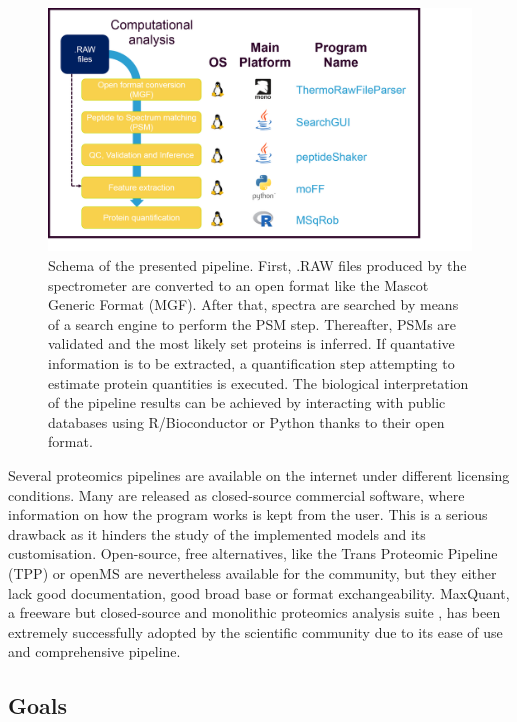 \documentclass[11pt, a4paper]{report}
\begin{document}
\begin{figure}[!h]
\includegraphics[width=\textwidth]{pipeline}
\caption{Schema of the presented pipeline. First, .RAW files produced by the spectrometer are converted to an open format like the Mascot Generic Format (\ac{MGF}). After that, spectra are searched by means of a search engine to perform the PSM step. Thereafter, PSMs are validated and the most likely set proteins is inferred. If quantative information is to be extracted, a quantification step attempting to estimate protein quantities is executed. The biological interpretation of the pipeline results can be achieved by interacting with public databases using R/Bioconductor or Python thanks to their open format.}
\label{fig:pipeline}
\end{figure}


Several proteomics pipelines are available on the internet under different licensing conditions. Many are released as closed-source commercial software, where information on how the program works is kept from the user. This is a serious drawback as it hinders the study of the implemented models and its customisation. Open-source, free alternatives, like the Trans Proteomic Pipeline (\ac{TPP}) \cite{Deutsch2011} or openMS \cite{Sturm2008} are nevertheless available for the community, but they either lack good documentation, good broad base or format exchangeability. MaxQuant, a freeware but closed-source and monolithic proteomics analysis suite \cite{Cox2008}, has been extremely successfully adopted by the scientific community due to its ease of use and comprehensive pipeline.

\subsection{Goals}
\end{document}
